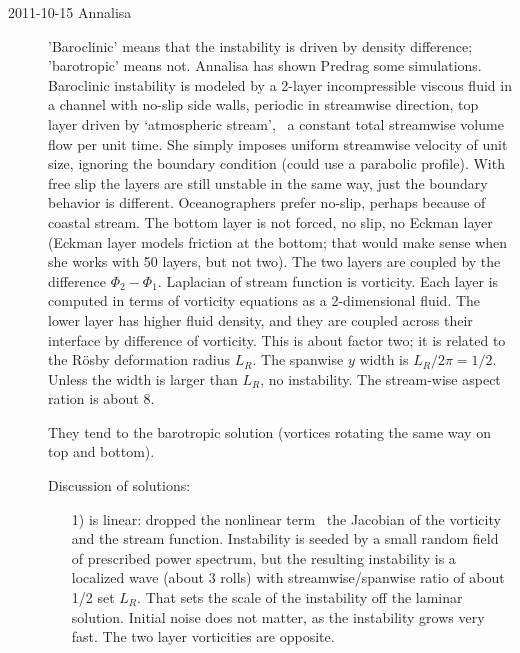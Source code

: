 \begin{description}
\item[2011-10-15 Annalisa]
'Baroclinic' means that the instability is driven by density difference;
'barotropic' means not. Annalisa has shown Predrag some simulations.
Baroclinic instability is modeled by a 2-layer incompressible viscous
fluid in a channel with no-slip side walls, periodic in streamwise
direction, top layer driven by `atmospheric stream', \ie\ a constant
total streamwise volume flow per unit time. She simply imposes uniform
streamwise velocity of unit size, ignoring the boundary condition (could
use a parabolic profile). With free slip the layers are still unstable in
the same way, just the boundary behavior is different. Oceanographers
prefer no-slip, perhaps because of coastal stream. The bottom layer is
not forced, no slip, no Eckman layer (Eckman layer models friction at the
bottom; that would make sense when she works with 50 layers, but not
two). The two layers are coupled by the difference $\Phi_2 - \Phi_1$.
Laplacian of stream function is vorticity. Each layer is computed in
terms of vorticity equations as a 2-dimensional fluid. The lower layer
has higher fluid density, and they are coupled across their interface by
difference of vorticity. This is about factor two; it is related to the
R\"osby deformation radius $L_R$. The spanwise $y$ width is $L_R/2\pi =
1/2$. Unless the width is larger than $L_R$, no instability. The
stream-wise aspect ration is about 8.

They tend to the barotropic solution (vortices rotating the same way on
top and bottom).



Discussion of solutions:
\begin{enumerate}
  \item [1)]
is linear: dropped the nonlinear term \ie\ the Jacobian of the vorticity
and the stream function. Instability is seeded by a small random field of
prescribed power spectrum, but the resulting instability is a localized
wave (about 3 rolls) with streamwise/spanwise ratio of about 1/2 set
$L_R$. That sets the scale of the instability off the laminar solution.
Initial noise does not matter, as the instability grows very fast. The
two layer vorticities are opposite.


\end{enumerate}
\end{description}
